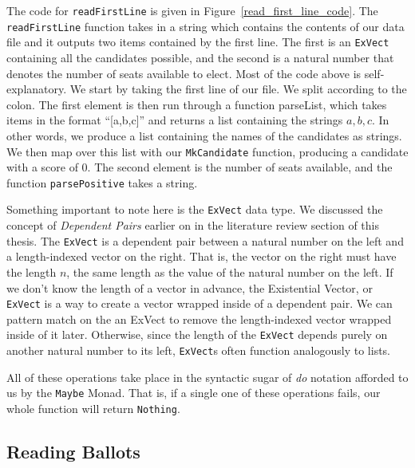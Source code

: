The code for \texttt{readFirstLine} is given in
Figure~\ref{read_first_line_code}. The \texttt{readFirstLine} function takes in
a string which contains the contents of our data file and it outputs two items
contained by the first line. The first is an \texttt{ExVect} containing all the
candidates possible, and the second is a natural number that denotes the number
of seats available to elect. Most of the code above is self-explanatory. We
start by taking the first line of our file. We split according to the colon. The
first element is then run through a function parseList, which takes items in the
format ``[a,b,c]'' and returns a list containing the strings $a, b,c$. In other
words, we produce a list containing the names of the candidates as strings. We
then map over this list with our  \texttt{MkCandidate} function, producing a
candidate with a score of 0. The second element is the number of seats
available, and the function \texttt{parsePositive} takes a string. 

Something important to note here is the \texttt{ExVect} data type. We discussed
the concept of \textit{Dependent Pairs} earlier on in the literature review
section of this thesis. The \texttt{ExVect} is a dependent pair between a
natural number on the left and a length-indexed vector on the right. That is,
the vector on the right must have the length $n$, the same length as the value
of the natural number on the left. If we don't know the length of a vector in
advance, the Existential Vector, or \texttt{ExVect} is a way to create a vector
wrapped inside of a dependent pair. We can pattern match on the an ExVect to
remove the length-indexed vector wrapped inside of it later. Otherwise, since
the length of the \texttt{ExVect} depends purely on another natural number to
its left, \texttt{ExVect}s often function analogously to lists. 

All of these operations take place in the syntactic sugar of \textit{do}
notation afforded to us by the \texttt{Maybe} Monad. That is, if a single one of
these operations fails, our whole function will return \texttt{Nothing}. 

\subsection{Reading Ballots}

